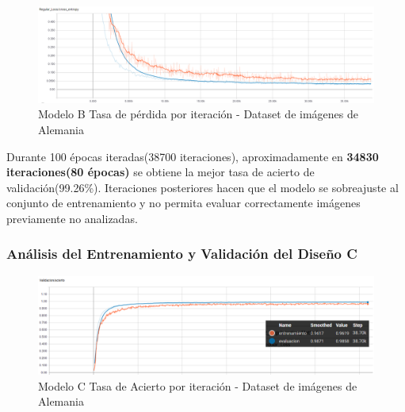 			
			\begin{figure}[H]
				\begin{center}
				\includegraphics[width=1\textwidth]{images/desarrollo/trainResults/german/model1Loss} 
				\end{center}
				\begin{center}
				\caption{\small{Modelo B Tasa de pérdida por iteración - Dataset de imágenes de Alemania}}
				
				{\small{\fontsize{10}{16.8}\selectfont {Fuente: Elaboración propia}}}
				\end{center}
				\vspace{-1.5em}
			\end{figure}

			Durante 100 épocas iteradas(38700 iteraciones), aproximadamente en  \textbf{34830 iteraciones(80 épocas)} se obtiene la mejor tasa de acierto de validación(99.26\%). Iteraciones posteriores hacen que el modelo se sobreajuste al conjunto de entrenamiento y no permita evaluar correctamente imágenes previamente no analizadas.



		\subsubsection{Análisis del Entrenamiento y Validación del Diseño C} 

			\begin{figure}[H]
				\begin{center}
				\includegraphics[width=1\textwidth]{images/desarrollo/trainResults/german/model4Acierto} 
				\end{center}
				\begin{center}
				\caption{\small{Modelo C Tasa de Acierto por iteración - Dataset de imágenes de Alemania  }}
				
				{\small{\fontsize{10}{16.8}\selectfont {Fuente: Elaboración propia}}}
				\end{center}
				\vspace{-1.5em}
			\end{figure}
			
